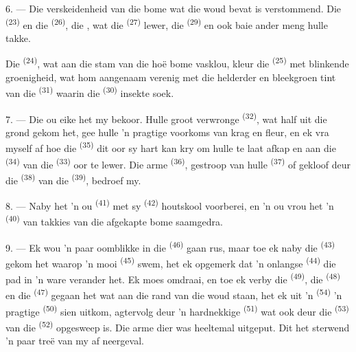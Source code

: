 6. --- Die verskeidenheid van die bome wat die woud bevat is verstommend. Die
 \textsuperscript{(23)} en die  \textsuperscript{(26)}, die
, wat die  \textsuperscript{(27)} lewer, die
 \textsuperscript{(29)} en ook baie ander meng hulle takke.

Die  \textsuperscript{(24)}, wat aan die stam van die hoë bome vasklou,
kleur die  \textsuperscript{(25)} met blinkende groenigheid, wat hom
aangenaam verenig met die helderder en bleekgroen tint van die 
\textsuperscript{(31)} waarin die  \textsuperscript{(30)} insekte soek.

\VUsaut{3.0mm}
\VUsaut{3.0mm}

7. --- Die ou eike het my bekoor. Hulle groot verwronge 
\textsuperscript{(32)}, wat half uit die grond gekom het, gee hulle 'n pragtige voorkoms
van krag en fleur, en ek vra myself af hoe die  \textsuperscript{(35)}
dit oor sy hart kan kry om hulle te laat afkap en aan die 
\textsuperscript{(34)} van die  \textsuperscript{(33)} oor te lewer.
Die arme  \textsuperscript{(36)}, gestroop van hulle 
\textsuperscript{(37)} of gekloof deur die  \textsuperscript{(38)} van die
 \textsuperscript{(39)}, bedroef my.

8. --- Naby het 'n ou  \textsuperscript{(41)} met sy
 \textsuperscript{(42)} houtskool voorberei, en 'n ou vrou het 'n
 \textsuperscript{(40)}  van takkies van die afgekapte
bome saamgedra.

\VUsaut{3.0mm}
\VUsaut{3.0mm}

9. --- Ek wou 'n paar oomblikke in die  \textsuperscript{(46)}
gaan rus, maar toe ek naby die  \textsuperscript{(43)} gekom het waarop
'n mooi  \textsuperscript{(45)} swem, het ek opgemerk dat 'n onlangse
 \textsuperscript{(44)} die pad in 'n ware  verander
het. Ek moes omdraai, en toe ek verby die  \textsuperscript{(49)}, die
 \textsuperscript{(48)} en die  \textsuperscript{(47)}
gegaan het wat aan die rand van die woud staan, het ek uit 'n 
\textsuperscript{(54)} 'n pragtige  \textsuperscript{(50)} sien uitkom,
agtervolg deur 'n hardnekkige  \textsuperscript{(51)} wat ook deur die
 \textsuperscript{(53)} van die 
\textsuperscript{(52)} opgesweep is. Die arme dier was heeltemal uitgeput. Dit het
sterwend 'n paar treë van my af neergeval.

